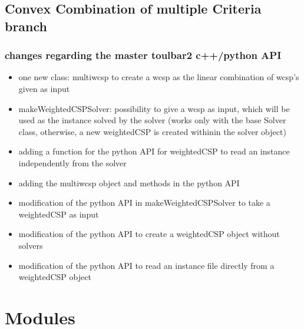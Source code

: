 \documentclass[letterpaper,10pt,openany,oneside,english]{sphinxmanual}
\begin{document}
\subsection{Convex Combination of multiple Criteria branch}
\label{\detokenize{_files/README:convex-combination-of-multiple-criteria-branch}}\label{\detokenize{_files/README:readme-6}}

\subsubsection{changes regarding the master toulbar2 c++/python API}
\label{\detokenize{_files/README:changes-regarding-the-master-toulbar2-c-python-api}}\begin{itemize}
\item {} 
\sphinxAtStartPar
one new class: multiwcsp to create a wcsp as the linear combination of wcsp’s given as input

\item {} 
\sphinxAtStartPar
makeWeightedCSPSolver: possibility to give a wcsp as input, which will be used as the instance solved by the solver (works only with the base Solver class, otherwise, a new weightedCSP is created withinin the solver object)

\item {} 
\sphinxAtStartPar
adding a function for the python API for weightedCSP to read an instance independently from the solver

\item {} 
\sphinxAtStartPar
adding the multiwcsp object and methods in the python API

\item {} 
\sphinxAtStartPar
modification of the python API in makeWeightedCSPSolver to take a weightedCSP as input

\item {} 
\sphinxAtStartPar
modification of the python API to create a weightedCSP object without solvers

\item {} 
\sphinxAtStartPar
modification of the python API to read an instance file directly from a weightedCSP object

\end{itemize}

\sphinxstepscope


\section{Modules}
\label{\detokenize{ref/ref_modules:modules}}\label{\detokenize{ref/ref_modules:ref-modules}}\label{\detokenize{ref/ref_modules::doc}}
\end{document}

